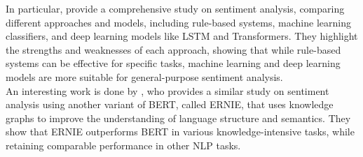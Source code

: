         In particular, \citet{gupta2024comprehensivestudysentimentanalysis} provide a comprehensive
        study on sentiment analysis, comparing different approaches and models, including
        rule-based systems, machine learning classifiers, and deep learning models like LSTM
        and Transformers. They highlight the strengths and weaknesses of each approach,
        showing that while rule-based systems can be effective for specific tasks, machine learning
        and deep learning models are more suitable for general-purpose sentiment analysis.\\
        
        An interesting work is done by \citet{wen2023sentiment}, who provides a
        similar study on sentiment analysis using another variant of BERT, called
        ERNIE, that uses knowledge graphs to improve the understanding of language
        structure and semantics. They show that ERNIE outperforms BERT in various
        knowledge-intensive tasks, while retaining comparable performance in 
        other NLP tasks. \citep{zhang2019ernieenhancedlanguagerepresentation}